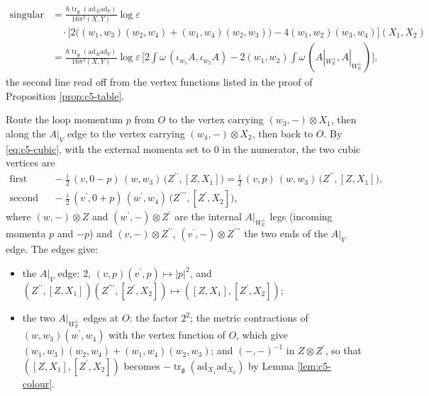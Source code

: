 \begin{example}
\[
\begin{aligned}
\text{singular part of (e)}&=\frac{\hbar\operatorname{tr}_{\mathfrak g}(\mathrm{ad}_X\mathrm{ad}_Y)}{16\pi^2(X,Y)}\log\varepsilon\\
&\quad\cdot\Big[2\big((w_1,w_3)(w_2,w_4)+(w_1,w_4)(w_2,w_3)\big)-4(w_1,w_2)(w_3,w_4)\Big](X_1,X_2)\\
&=\frac{\hbar\operatorname{tr}_{\mathfrak g}(\mathrm{ad}_X\mathrm{ad}_Y)}{16\pi^2(X,Y)}\log\varepsilon\,\Big[2\int\omega\,(\iota_{w_1}A,\iota_{w_2}A)-2(w_1,w_2)\int\omega\,(A|_{W_{\mathbb R}^\perp},A|_{W_{\mathbb R}^\perp})\Big],
\end{aligned}
\]
the second line read off from the vertex functions listed in the proof of Proposition \ref{prop:c5-table}.
\end{example}

\begin{example}
\label{ex:c5-f}
Route the loop momentum $p$ from $O$ to the vertex carrying $(w_3,-)\otimes X_1$, then along the $A|_V$ edge to the vertex carrying $(w_4,-)\otimes X_2$, then back to $O$. By \eqref{eq:c5-cubic}, with the external momenta set to $0$ in the numerator, the two cubic vertices are
\[
\begin{aligned}
\text{first vertex: }&\ -\tfrac i2\,(v,0-p)\,(w,w_3)\,\big(Z^{\prime\prime},[Z,X_1]\big)=\tfrac i2\,(v,p)\,(w,w_3)\,\big(Z^{\prime\prime},[Z,X_1]\big),\\
\text{second vertex: }&\ -\tfrac i2\,(v^{\prime},0+p)\,(w^{\prime},w_4)\,\big(Z^{\prime\prime\prime},[Z^{\prime},X_2]\big),
\end{aligned}
\]
where $(w,-)\otimes Z$ and $(w^{\prime},-)\otimes Z^{\prime}$ are the internal $A|_{W_{\mathbb R}^\perp}$ legs (incoming momenta $p$ and $-p$) and $(v,-)\otimes Z^{\prime\prime}$, $(v^{\prime},-)\otimes Z^{\prime\prime\prime}$ the two ends of the $A|_V$ edge. The edges give:
\begin{itemize}
\item the $A|_V$ edge: $2$, $(v,p)(v^{\prime},p)\mapsto|p|^2$, and $(Z^{\prime\prime},[Z,X_1])(Z^{\prime\prime\prime},[Z^{\prime},X_2])\mapsto([Z,X_1],[Z^{\prime},X_2])$;
\item the two $A|_{W_{\mathbb R}^\perp}$ edges at $O$: the factor $2^2$; the metric contractions of $(w,w_3)(w^{\prime},w_4)$ with the vertex function of $O$, which give $(w_1,w_3)(w_2,w_4)+(w_1,w_4)(w_2,w_3)$; and $(-,-)^{-1}$ in $Z\otimes Z^{\prime}$, so that $([Z,X_1],[Z^{\prime},X_2])$ becomes $-\operatorname{tr}_{\mathfrak g}(\mathrm{ad}_{X_1}\mathrm{ad}_{X_2})$ by Lemma \ref{lem:c5-colour}.

\end{itemize}
\end{example}
